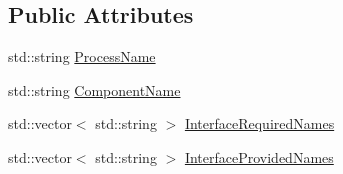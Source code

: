 \subsection*{Public Attributes}
\begin{DoxyCompactItemize}
\item 
std\-::string \hyperlink{classmts_description_interface_aa1c020a221d03f7d42beaa0f76133246}{Process\-Name}
\item 
std\-::string \hyperlink{classmts_description_interface_a23c0642e38c2a435309fd961f3065a67}{Component\-Name}
\item 
std\-::vector$<$ std\-::string $>$ \hyperlink{classmts_description_interface_a7cd4857cf92423bd5f0e481bf394812c}{Interface\-Required\-Names}
\item 
std\-::vector$<$ std\-::string $>$ \hyperlink{classmts_description_interface_ae8e633d272098d0ea2e39406ee453aa3}{Interface\-Provided\-Names}
\end{DoxyCompactItemize}


